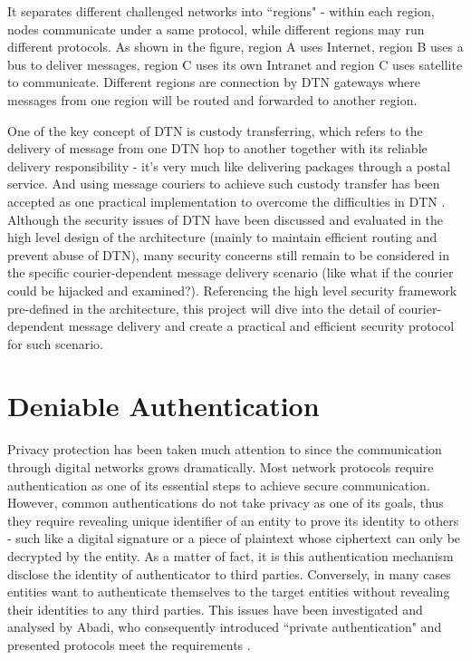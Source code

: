 It separates different challenged networks into ``regions" - within each region, nodes communicate under a same protocol, while different regions may run different protocols. As shown in the figure, region A uses Internet, region B uses a bus to deliver messages, region C uses its own Intranet and region C uses satellite to communicate. Different regions are connection by DTN gateways where messages from one region will be routed and forwarded to another region.

One of the key concept of DTN is custody transferring, which refers to the delivery of message from one DTN hop to another together with its reliable delivery responsibility - it's very much like delivering packages through a postal service. And using message couriers to achieve such custody transfer has been accepted as one practical implementation to overcome the difficulties in DTN \cite{Jain}\cite{Zhao}. Although the security issues of DTN have been discussed and evaluated in the high level design of the architecture \cite{Cerf}\cite{Scottrfc} (mainly to maintain efficient routing and prevent abuse of DTN), many security concerns still remain to be considered in the specific courier-dependent message delivery scenario (like what if the courier could be hijacked and examined?). Referencing the high level security framework pre-defined in the architecture, this project will dive into the detail of courier-dependent message delivery and create a practical and efficient security protocol for such scenario.

\section{Deniable Authentication}
Privacy protection has been taken much attention to since the communication through digital networks grows dramatically. Most network protocols require authentication as one of its essential steps to achieve secure communication. However, common authentications do not take privacy as one of its goals, thus they require revealing unique identifier of an entity to prove its identity to others - such like a digital signature or a piece of plaintext whose ciphertext can only be decrypted by the entity. As a matter of fact, it is this authentication mechanism disclose the identity of authenticator to third parties. Conversely, in many cases entities want to authenticate themselves to the target entities without revealing their identities to any third parties. This issues have been investigated and analysed by Abadi, who consequently introduced ``private authentication" and presented protocols meet the requirements \cite{Abadi}.

